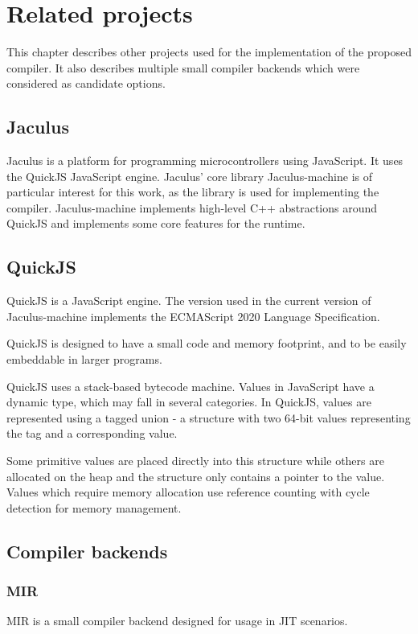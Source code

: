 \chapter{Related projects}

This chapter describes other projects used for the implementation of the proposed compiler. It also describes multiple small compiler backends which were considered as candidate options.

\section{Jaculus}

Jaculus is a platform for programming microcontrollers using JavaScript. It uses the QuickJS JavaScript engine. Jaculus' core library Jaculus-machine is of particular interest for this work, as the library is used for implementing the compiler. Jaculus-machine implements high-level C++ abstractions around QuickJS and implements some core features for the runtime.

\section{QuickJS}

QuickJS is a JavaScript engine. The version used in the current version of Jaculus-machine implements the ECMAScript 2020 Language Specification\cite{ecma262}.

QuickJS is designed to have a small code and memory footprint, and to be easily embeddable in larger programs.

QuickJS uses a stack-based bytecode machine. Values in JavaScript have a dynamic type, which may fall in several categories. In QuickJS, values are represented using a tagged union - a structure with two 64-bit values representing the tag and a corresponding value.

Some primitive values are placed directly into this structure while others are allocated on the heap and the structure only contains a pointer to the value. Values which require memory allocation use reference counting with cycle detection for memory management.



\section{Compiler backends}


\subsection{MIR}

MIR is a small compiler backend designed for usage in JIT scenarios.
